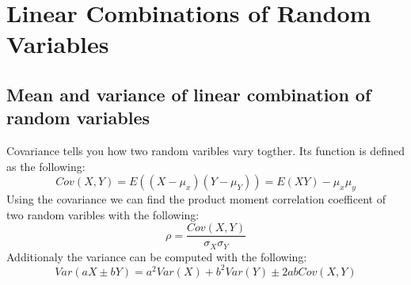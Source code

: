     \section{Linear Combinations of Random Variables}
        \subsection{Mean and variance of linear combination of random variables}
        Covariance tells you how two random varibles vary togther. Its function is defined as the following:
        $$
        Cov(X, Y) = E((X-\mu_x)(Y-\mu_Y)) = E(XY) - \mu_x \mu_y
        $$
        Using the covariance we can find the product moment correlation coefficent of two random varibles with the following:
        $$
        \rho = \dfrac{Cov(X, Y)}{\sigma_X \sigma_Y}
        $$
        Additionaly the variance can be computed with the following:
        $$
        Var(aX \pm bY) = a^2 Var(X) + b^2 Var(Y) \pm 2ab Cov(X, Y)
        $$

